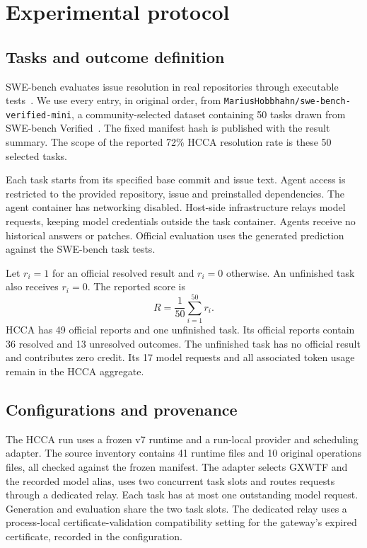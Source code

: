 \documentclass[10pt,a4paper]{article}
\begin{document}
\section{Experimental protocol}

\subsection{Tasks and outcome definition}

SWE-bench evaluates issue resolution in real repositories through executable
tests~\cite{swebench}. We use every entry, in original order, from
\texttt{MariusHobbhahn/swe-bench-verified-mini}, a community-selected dataset
containing 50 tasks drawn from SWE-bench Verified~\cite{mini}. The fixed
manifest hash is published with the result summary. The scope of the reported
72\% HCCA resolution rate is these 50 selected tasks.

Each task starts from its specified base commit and issue text. Agent access
is restricted to the provided repository, issue and preinstalled dependencies.
The agent container has networking disabled. Host-side infrastructure relays
model requests, keeping model credentials outside the task container. Agents
receive no historical answers or patches. Official evaluation uses the generated
prediction against the SWE-bench task tests.

Let $r_i=1$ for an official resolved result and $r_i=0$ otherwise. An unfinished
task also receives $r_i=0$. The reported score is
\begin{equation}
  R = \frac{1}{50}\sum_{i=1}^{50} r_i.
\end{equation}
HCCA has 49 official reports and one unfinished task. Its official reports
contain 36 resolved and 13 unresolved outcomes. The unfinished task has no
official result and contributes zero credit. Its 17 model requests and all
associated token usage remain in the HCCA aggregate.

\subsection{Configurations and provenance}

The HCCA run uses a frozen v7 runtime and a run-local provider and scheduling
adapter. The source inventory contains 41 runtime files and 10 original
operations files, all checked against the frozen manifest. The adapter selects
GXWTF and the recorded model alias, uses two concurrent task slots and routes
requests through a dedicated relay. Each task has at most one outstanding model
request. Generation and evaluation share the two task slots.
The dedicated relay uses a process-local certificate-validation compatibility
setting for the gateway's expired certificate, recorded in the configuration.
\end{document}
